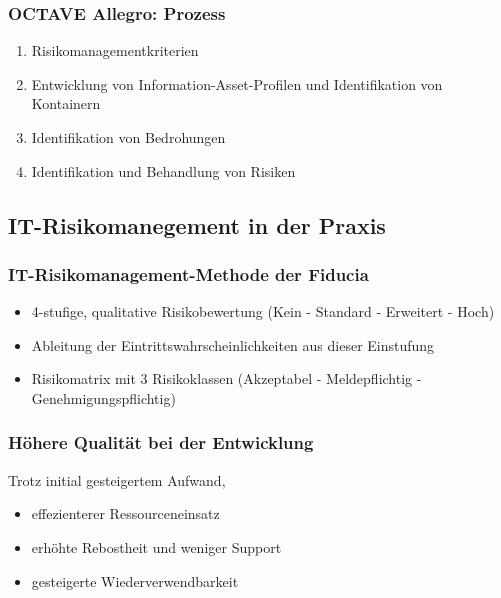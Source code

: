 \subsubsection{OCTAVE Allegro: Prozess}
\begin{enumerate}
	\item Risikomanagementkriterien
	\item Entwicklung von Information-Asset-Profilen und Identifikation von Kontainern
	\item Identifikation von Bedrohungen
	\item Identifikation und Behandlung von Risiken
\end{enumerate}


\subsection{IT-Risikomanegement in der Praxis}

\subsubsection{IT-Risikomanagement-Methode der Fiducia}
\begin{itemize}
	\item 4-stufige, qualitative Risikobewertung (Kein - Standard - Erweitert - Hoch)
	\item Ableitung der Eintrittswahrscheinlichkeiten aus dieser Einstufung
	\item Risikomatrix mit 3 Risikoklassen (Akzeptabel - Meldepflichtig - Genehmigungspflichtig)
\end{itemize}

\subsubsection{Höhere Qualität bei der Entwicklung}
Trotz initial gesteigertem Aufwand,

\begin{itemize}
	\item effezienterer Ressourceneinsatz
	\item erhöhte Rebostheit und weniger Support
	\item gesteigerte Wiederverwendbarkeit
\end{itemize}


